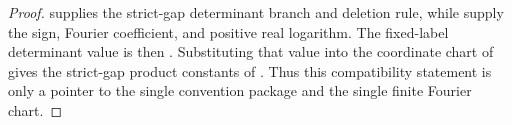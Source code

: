 \begin{proof}
   supplies the strict-gap
  determinant branch and deletion rule, while
  supply the sign, Fourier coefficient, and positive real logarithm.  The
  fixed-label determinant value is then
  .  Substituting that value into
  the coordinate chart of  gives
  the strict-gap product constants of .
  Thus this compatibility statement is only a pointer to the single
  convention package and the single finite Fourier chart.
\end{proof}

